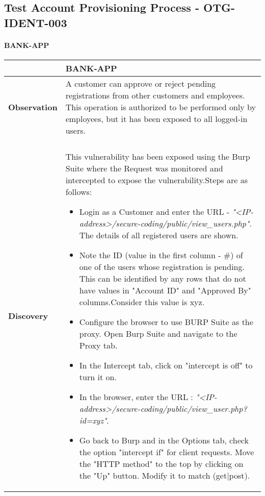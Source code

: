 \subsection{Test Account Provisioning Process - OTG-IDENT-003} \label{OTG-IDENT-003}

\paragraph{BANK-APP} \mbox{}
\begin{longtable*}{p{.20\textwidth} | p{.80\textwidth}}
    \hline
    & \textbf{BANK-APP} \\
    \hline
    \textbf{Observation} &
     A customer can approve or reject pending registrations from other customers and employees. This operation is authorized to be performed only by employees, but it has been exposed to all logged-in users. 
    \\\\
    \textbf{Discovery} &
       This vulnerability has been exposed using the Burp Suite where the Request was monitored and intercepted to expose the vulnerability.Steps are as follows:
       \begin{itemize}
       \item  Login as a Customer and enter the URL -  \textit{"<IP-address>/secure-coding/public/view\_users.php"}. The details of all registered users are shown. 
       
       \item Note the ID (value in the first column - \#) of one of the users whose registration is pending. This can be identified by any rows that do not have values in "Account ID" and "Approved By" columns.Consider this value is xyz.
       
       \item  Configure the browser to use BURP Suite as the proxy. Open Burp Suite and navigate to the Proxy tab.
       
       \item In the Intercept tab, click on "intercept is off" to turn it on.
       
       \item In the browser, enter the URL :
              \textit{"<IP-address>/secure-coding/public/view\_user.php?id=xyz"}.
       
       \item Go back to Burp and in the Options tab, check the option "intercept if" for client requests. Move the "HTTP method" to the top by clicking on the "Up" button. Modify it to match (get|post).
       

\end{itemize}
\end{longtable*}
